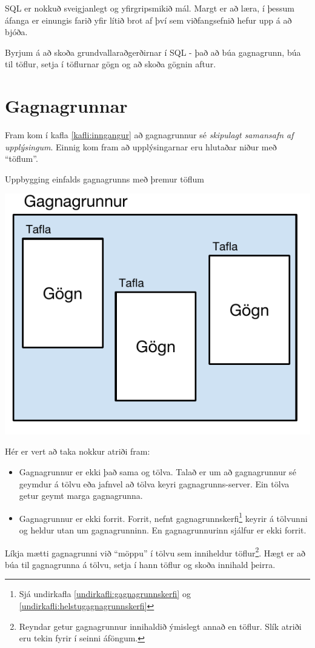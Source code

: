 SQL er nokkuð sveigjanlegt og yfirgripsmikið mál. 
Margt er að læra, í þessum áfanga er einungis farið yfir lítið brot af því sem viðfangsefnið hefur upp á að bjóða.

Byrjum á að skoða grundvallaraðgerðirnar í SQL - það að búa gagnagrunn, búa til töflur, setja í töflurnar gögn og að skoða gögnin aftur.
\section{Gagnagrunnar}
Fram kom í kafla \ref{kafli:inngangur} að gagnagrunnur sé \emph{skipulagt samansafn af upplýsingum}. Einnig kom fram að upplýsingarnar eru hlutaðar niður með ``töflum''.
\begin{marginfigure}
\caption[Uppbygging gagnagrunns]{Uppbygging einfalds gagnagrunns með þremur töflum}
\label{mynd:uppbygginggagnagrunns}
\centering
\includegraphics[width=\linewidth]{myndir/uppbygging-gagnagrunns}
\end{marginfigure}
Hér er vert að taka nokkur atriði fram:
\begin{itemize}
 \item Gagnagrunnur er ekki það sama og tölva. Talað er um að gagnagrunnur sé geymdur á tölvu eða jafnvel að tölva keyri gagnagrunns-server. Ein tölva getur geymt marga gagnagrunna.
 \item Gagnagrunnur er ekki forrit. Forrit, nefnt gagnagrunnskerfi\footnote{Sjá undirkafla \ref{undirkafli:gagnagrunnskerfi} og \ref{undirkafli:helstugagnagrunnskerfi}} keyrir á tölvunni og heldur utan um gagnagrunninn. En gagnagrunnurinn sjálfur er ekki forrit.
\end{itemize}
Líkja mætti gagnagrunni við ``möppu'' í tölvu sem inniheldur töflur\footnote{Reyndar getur gagnagrunnur innihaldið ýmislegt annað en töflur. Slík atriði eru tekin fyrir í seinni áföngum.}. Hægt er að búa til gagnagrunna á tölvu, setja í hann töflur og skoða innihald þeirra.

